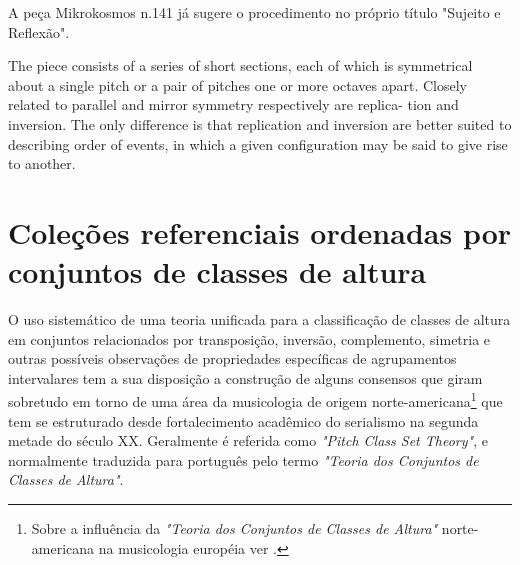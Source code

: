 \documentclass[
	12pt,				%
	openright,			%
	twoside,			%
	a4paper,			%
	english,			%
	french,				%
	spanish,			%
	brazil				%
	]{abntex2}
\begin{document}
A peça Mikrokosmos n.141 já sugere o procedimento no próprio título "Sujeito e Reflexão".

\begin{citacao}
The piece consists of a series of short sections, each of which is symmetrical about a single
pitch or a pair of pitches one or more octaves apart.\cite[p. 187]{bernard1986space}
Closely related to parallel and mirror symmetry respectively are replica-
tion and inversion. The only difference is that replication and inversion are
better suited to describing order of events, in which a given configuration
may be said to give rise to another.\cite[p. 190]{bernard1986space}
\end{citacao}




\section{Coleções referenciais ordenadas por conjuntos de classes de altura}

O uso sistemático de uma teoria unificada para a classificação de classes de altura em conjuntos relacionados por transposição, inversão, complemento, simetria e outras possíveis observações de propriedades específicas de agrupamentos intervalares tem a sua disposição a construção de alguns consensos que giram sobretudo em torno de uma área da musicologia de origem norte-americana\footnote{Sobre a influência da \textit{"Teoria dos Conjuntos de Classes de Altura"} norte-americana na musicologia européia ver .} que tem se estruturado desde fortalecimento acadêmico do serialismo na segunda metade do século XX. Geralmente é referida como \textit{"Pitch Class Set Theory"}, e normalmente traduzida para português pelo termo \textit{"Teoria dos Conjuntos de Classes de Altura"}\cite{straus2004}.
\end{document}
